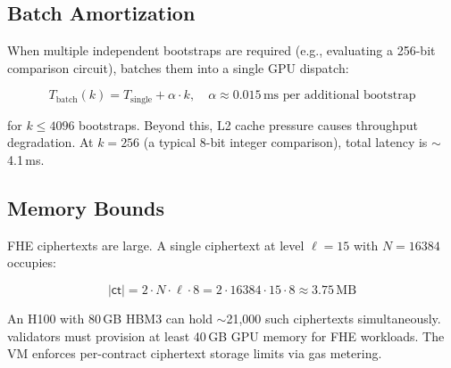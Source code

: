\subsection{Batch Amortization}

When multiple independent bootstraps are required (e.g., evaluating a 256-bit comparison circuit), \Zoo{} batches them into a single GPU dispatch:

\begin{equation}
  T_{\mathrm{batch}}(k) = T_{\mathrm{single}} + \alpha \cdot k, \quad \alpha \approx 0.015\,\text{ms per additional bootstrap}
\end{equation}

\noindent for $k \leq 4096$ bootstraps. Beyond this, L2 cache pressure causes throughput degradation. At $k = 256$ (a typical 8-bit integer comparison), total latency is $\sim$4.1\,ms.

\subsection{Memory Bounds}

FHE ciphertexts are large. A single \CKKS{} ciphertext at level $\ell = 15$ with $N = 16384$ occupies:

\begin{equation}
  |\mathsf{ct}| = 2 \cdot N \cdot \ell \cdot 8 = 2 \cdot 16384 \cdot 15 \cdot 8 \approx 3.75\,\text{MB}
\end{equation}

An H100 with 80\,GB HBM3 can hold $\sim$21{,}000 such ciphertexts simultaneously. \Zoo{} validators must provision at least 40\,GB GPU memory for FHE workloads. The VM enforces per-contract ciphertext storage limits via gas metering.

